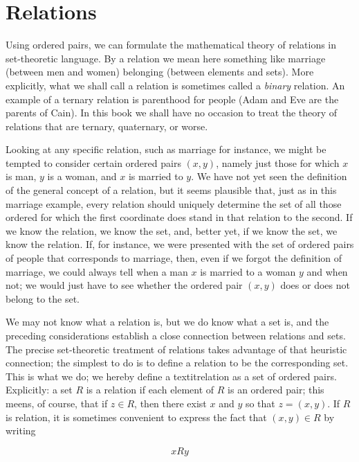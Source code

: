 
\chapter{Relations}

Using ordered pairs, we can formulate the mathematical theory of relations in set-theoretic language. By a relation we mean here something like marriage (between men and women) belonging (between elements and sets).  More explicitly, what we shall call a relation is sometimes called a \textit{binary} relation. An example of a ternary relation is parenthood for people (Adam and Eve are the parents of Cain). In this book we shall have no occasion to treat the theory of relations that are ternary, quaternary, or worse. 

Looking at any specific relation, such as marriage for instance, we might be tempted to consider certain ordered pairs $(x,y)$, namely just those for which $x$ is man, $y$ is a woman, and $x$ is married to $y$. We have not yet seen the definition of the general concept of a relation, but it seems plausible that, just as in this marriage example, every relation should uniquely determine the set of all those ordered for which the first coordinate does stand in that relation to the second. If we know the relation, we know the set, and, better yet, if we know the set, we know the relation. If, for instance, we were presented with the set of ordered pairs of people that corresponds to marriage, then, even if we forgot the definition of marriage, we could always tell when a man $x$ is married to a woman $y$ and when not; we would just have to see whether the ordered pair $(x,y)$ does or does not belong to the set.

We may not know what a relation is, but we do know what a set is, and the preceding considerations establish a close connection between relations and sets. The precise set-theoretic treatment of relations takes advantage of that heuristic connection; the simplest to do is to define a relation to be the corresponding set. This is what we do; we hereby define a textit{relation} as a set of ordered pairs. Explicitly: a set $R$ is a relation if each element of $R $ is an ordered pair; this meens, of course, that if $z \in R $, then there exist $x$ and $y$ so that $z = (x,y)$. If $R $ is relation, it is sometimes convenient to express the fact that $(x, y) \in R $ by writing 

\begin{equation*}
x R  y
\end{equation*}

